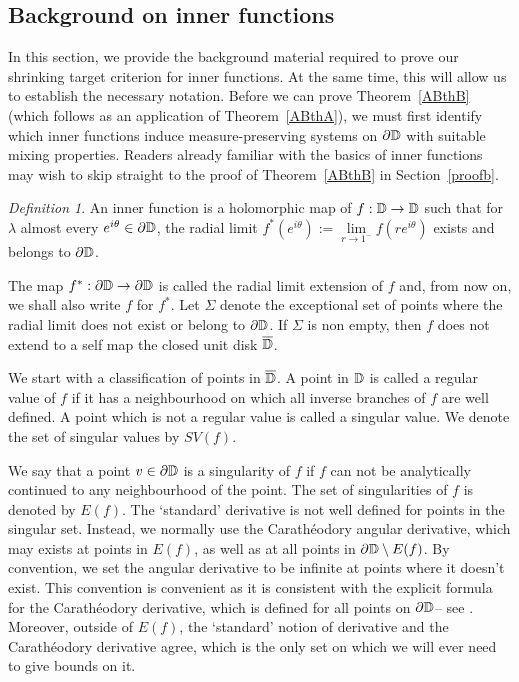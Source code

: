 \documentclass[11pt,reqno]{amsart}
\newcommand{\D}{{\Bbb D}}
\newcommand{\0}{\mathbf{0}}
\newtheorem{definition}{Definition}
\theoremstyle{remark}
\numberwithin{equation}{section}
\newtheorem{definition}[theorem]{Definition}
\theoremstyle{remark}
\numberwithin{equation}{section}
\begin{document}
\subsection{Background on inner functions}\label{preres}
In this section, we provide the background material required to prove our shrinking target criterion for inner functions. At the same time, this will allow us to establish the necessary notation.
Before we can prove Theorem~\ref{ABthB} (which follows as an application of Theorem~\ref{ABthA}), we must first identify which inner functions induce measure-preserving  systems on $\partial \D$ with suitable mixing properties. Readers already familiar with the basics of inner functions may wish to skip straight to the proof of Theorem~\ref{ABthB} in Section~\ref{proofb}.

\begin{definition}\label{definner}
    An inner function is a holomorphic  map of $f: \D \to \D$  such that for $\lambda$ almost every $e^{i \theta} \in \partial \D$, the radial limit $f^*(e^{i\theta}):=\lim\limits_{r \to 1^-}f(re^{i\theta})$ exists and belongs to $\partial \D$.
\end{definition} 
The map $f^*: \partial \D \to \partial \D$ is called the radial limit extension of $f$ and, from now on, we shall also write $f$ for $f^*$. Let $\Sigma$ denote the exceptional set of points where the radial limit does not exist or belong to $\partial \D$. If $\Sigma$ is non empty, then $f$ does not extend to a self map the closed unit disk $\overline{\D}$. 

We start with a classification of points in $\overline{\D}$. A point in $\D$ is called a regular value of $f$ if it has a neighbourhood on which all inverse branches of $f$ are well defined. A point which is not a regular value is called a singular value. We denote the set of singular values by $SV(f)$.

We say that a point $v \in \partial \D$ is a singularity of $f$ if $f$ can not be analytically continued to any neighbourhood of the point. The set of singularities of $f$ is denoted by $E(f)$. 
 The `standard' derivative is not well defined for points in the singular set. Instead, we normally use the Carathéodory angular derivative, which may exists at points in $E(f)$, as well as at all points in $\partial\D \setminus E(f)$. By convention, we set the angular derivative to be infinite at points where it doesn't exist. This convention is convenient as it is consistent with the explicit formula for the Carathéodory derivative, which is defined for all points on $\partial \D$-- see \cite[Theorem~4.15]{deriv}.  Moreover, outside of $E(f)$, the `standard' notion of derivative and the Carathéodory derivative agree, which is the only set on which we will ever need to give bounds on it. 
\end{document}
